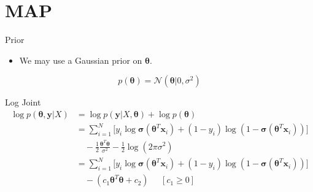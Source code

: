 \documentclass{beamer}
\begin{document}
\section{MAP}

\begin{frame}{Prior}
    \begin{itemize}
        \item We may use a Gaussian prior on $\boldsymbol{\theta}$.
    \end{itemize}

    \begin{equation*}
        p(\boldsymbol{\theta}) = \mathcal{N}(\boldsymbol{\theta} | 0, \sigma^2)
    \end{equation*}

\end{frame}

\begin{frame}{Log Joint}
    \begin{align*}
        \log p(\boldsymbol{\theta}, \boldsymbol{y} | X) & = \log p(\boldsymbol{y} | X, \boldsymbol{\theta}) + \log p(\boldsymbol{\theta})                                                                                                                                 \\
                                                        & = \sum_{i=1}^N \Big[y_i \log \boldsymbol{\sigma}\left(\boldsymbol{\theta}^T\boldsymbol{x}_i\right) + (1 - y_i) \log \left(1 - \boldsymbol{\sigma}\left(\boldsymbol{\theta}^T\boldsymbol{x}_i\right)\right)\Big] \\
                                                        & \quad  - \frac{1}{2} \frac{\boldsymbol{\theta}^T\boldsymbol{\theta}}{\sigma^2} - \frac{1}{2}\log (2 \pi \sigma^2)                                                                                               \\
                                                        & = \sum_{i=1}^N \Big[y_i \log \boldsymbol{\sigma}\left(\boldsymbol{\theta}^T\boldsymbol{x}_i\right) + (1 - y_i) \log \left(1 - \boldsymbol{\sigma}\left(\boldsymbol{\theta}^T\boldsymbol{x}_i\right)\right)\Big] \\
                                                        & \quad - \left(c_1 \boldsymbol{\theta}^T\boldsymbol{\theta} + c_2\right) \;\;\;\;\; [c_1 \ge 0]                                                                                                                  \\
    \end{align*}
\end{frame}
\end{document}
